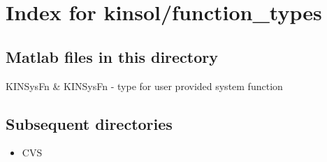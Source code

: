 \section{Index for {\sc kinsol/function_types}}

\subsection{Matlab files in this directory}

\begin{tabular}

KINSysFn & KINSysFn - type for user provided system function  \\
\end{tabular}


\subsection{Subsequent directories}

\begin{itemize}


\item CVS
\end{itemize}